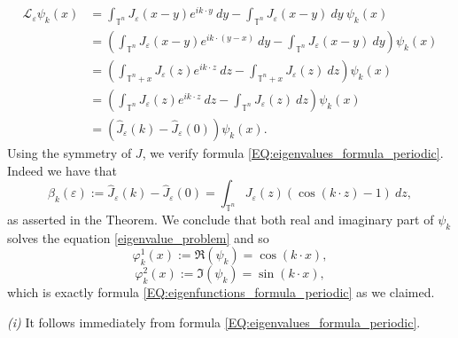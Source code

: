 \documentclass[12pt, a4paper]{article}
\theoremstyle{break}
\theoremstyle{break}
\theoremstyle{break}
\theoremstyle{break}
\theoremstyle{break}
\newcommand{\Leo}{\mathcal{L}_{\varepsilon}}
\begin{document}
\begin{align*}
    \Leo \psi_k(x) &= \int_{\mathbb{T}^n} J_\varepsilon(x-y) e^{ik\cdot y}\:dy - \int_{\mathbb{T}^n} J_\varepsilon(x-y)\:dy\: \psi_k(x) \\
    &= \left(\int_{\mathbb{T}^n} J_\varepsilon(x-y) e^{ik\cdot (y-x)}\:dy - \int_{\mathbb{T}^n} J_\varepsilon(x-y)\:dy\right) \psi_k(x) \\
    &= \left(\int_{\mathbb{T}^n + x} J_\varepsilon(z) e^{ik\cdot z}\:dz - \int_{\mathbb{T}^n + x} J_\varepsilon(z)\:dz\right) \psi_k(x) \\
    &= \left( \int_{\mathbb{T}^n} J_\varepsilon(z) e^{ik\cdot z}\:dz - \int_{\mathbb{T}^n} J_\varepsilon(z)\:dz\right) \psi_k(x) \\
    &= \left(\hat{J}_\varepsilon(k) - \hat{J}_\varepsilon(0)\right) \psi_k(x).
\end{align*}
Using the symmetry of $J$, we verify formula \eqref{EQ:eigenvalues_formula_periodic}. Indeed we have that
\begin{equation*}
    \beta_k(\varepsilon) := \hat{J}_\varepsilon(k) - \hat{J}_\varepsilon(0) = \int_{\mathbb{T}^n} J_\varepsilon(z) (\cos(k\cdot z) - 1)\:dz,
\end{equation*}
as asserted in the Theorem. We conclude that both real and imaginary part of $\psi_k$ solves the equation \eqref{eigenvalue_problem} and so
$$\varphi_k^1(x) := \Re(\psi_k) = \cos(k \cdot x),$$
$$\varphi_k^2(x) := \Im(\psi_k) = \sin(k \cdot x),$$
which is exactly formula \eqref{EQ:eigenfunctions_formula_periodic} as we claimed.

\textit{(i)} It follows immediately from formula \eqref{EQ:eigenvalues_formula_periodic}.
\end{document}
